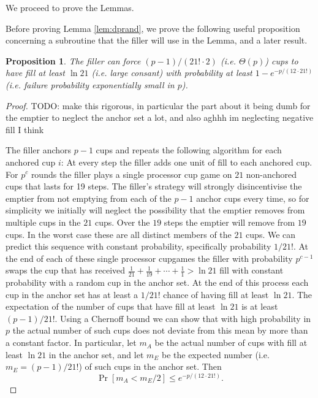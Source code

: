 \documentclass{article}[11pt]
\newtheorem{proposition}{Proposition}
\begin{document}
We proceed to prove the Lemmas. 

Before proving Lemma \ref{lem:dprand}, we prove the following useful
proposition concerning a subroutine that the filler will use in the Lemma, and
a later result.
\begin{proposition}
  \label{prop:tail}
  The filler can force $(p-1)/(21! \cdot 2)$ (i.e. $\Theta(p)$) cups to have
  fill at least $\ln 21$ (i.e. large consant) with probability at least
  $1-e^{-p/(12\cdot 21!)}$ (i.e. failure probability exponentially small in $p$).
\end{proposition}
\begin{proof}
  {\color{red} TODO: make this rigorous, in particular the part about it being dumb
  for the emptier to neglect the anchor set a lot, and also aghhh im neglecting
negative fill I think}

  The filler anchors $p-1$ cups and repeats the following algorithm for each anchored cup $i$:
  At every step the filler adds one unit of fill to each anchored cup. For $p^c$
  rounds the filler plays a single processor cup game on $21$ non-anchored cups
  that lasts for 19 steps. The filler's strategy will strongly disincentivise
  the emptier from not emptying from each of the $p-1$ anchor cups every time,
  so for simplicity we initially will neglect the possibility that the emptier
  removes from multiple cups in the $21$ cups. Over the $19$ steps the emptier
  will remove from $19$ cups. In the worst case these are all distinct members
  of the $21$ cups. We can predict this sequence with constant probability,
  specifically probability $1/21!$. At the end of each of these single
  processor cupgames the filler with probability $p^{c-1}$
  swaps the cup that has received $\frac{1}{21} + \frac{1}{19} + \cdots +
  \frac{1}{1} > \ln 21$ fill with constant probability with a random cup in the
  anchor set.  At the end of this process each cup in the anchor set has at
  least a $1/21!$ chance of having fill at least $\ln 21.$ The expectation of
  the number of cups that have fill at least $\ln 21$ is at least $(p-1)/21!$. 
  Using a Chernoff bound we can show that with high probability in $p$ the actual
  number of such cups does not deviate from this mean by more than a constant
  factor. In particular, let $m_A$ be the actual number of cups with fill at
  least $\ln 21$ in the anchor set, and let $m_E$ be the expected number (i.e.
  $m_E = (p-1)/21!$) of such cups in the anchor set. Then $$\Pr[m_A < m_E /2 ]
  \le e^{-p / (12\cdot 21!)}.$$
  
\end{proof}
\end{document}
